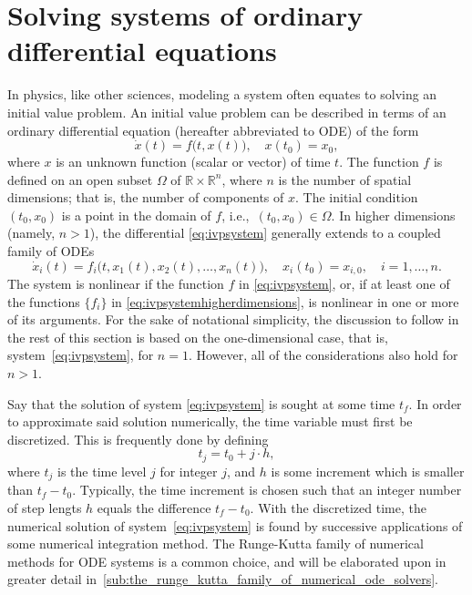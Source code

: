 \section[Solving systems of ordinary differential equations]%
{Solving systems of ordinary differential eq\null{}uations}%
\label{sec:solving_systems_of_ordinary_differential_equations}

In physics, like other sciences, modeling a system often equates to solving an
initial value problem. An initial value problem can be described in terms of an
ordinary differential equation (hereafter abbreviated to ODE) of the form
\begin{equation}
    \label{eq:ivpsystem}
    \dot{x}(t) = f\big(t,x(t)\big), \quad x(t_{0}) = x_{0},
\end{equation}
where $x$ is an unknown function (scalar or vector) of time $t$. The function
$f$ is defined on an open subset $\Omega$ of $\mathbb{R}\times\mathbb{R}^{n}$,
where $n$ is the number of spatial dimensions; that is, the number of
components of $x$. The initial condition $(t_{0},x_{0})$ is a point in the
domain of $f$, i.e.,\ $(t_{0},x_{0})\in\Omega$. In higher dimensions (namely,
$n>1$), the differential \cref{eq:ivpsystem} generally extends to a coupled
family of ODEs
\begin{equation}
    \label{eq:ivpsystemhigherdimensions}
    \dot{x}_{i}(t) = f_{i}\big(t,x_{1}(t),x_{2}(t),\ldots,x_{n}(t)\big),%
    \quad x_{i}(t_{0}) = x_{i,0}, \quad i = 1,\ldots,n.
\end{equation}
The system is nonlinear if the function $f$ in \cref{eq:ivpsystem}, or, if at
least one of the functions $\{f_{i}\}$ in \cref{eq:ivpsystemhigherdimensions},
is nonlinear in one or more of its arguments. For the sake of notational
simplicity, the discussion to follow in the rest of this section is based
on the one-dimensional case, that is, system~\eqref{eq:ivpsystem}, for $n=1$.
However, all of the considerations also hold for $n>1$.

Say that the solution of system \eqref{eq:ivpsystem} is sought at some time
$t_{f}$. In order to approximate said solution numerically, the time variable
must first be discretized. This is frequently done by defining
\begin{equation}
    \label{eq:discretime}
    t_{j} = t_{0}+j\cdot{}h,
\end{equation}
where $t_{j}$ is the time level $j$ for integer $j$, and $h$ is some increment
which is smaller than $t_{f}-t_{0}$. Typically, the time increment is chosen
such that an integer number of step lengts $h$ equals the difference
$t_{f}-t_{0}$. With the discretized time, the numerical solution of
system~\eqref{eq:ivpsystem} is found by successive applications of some
numerical integration method. The Runge-Kutta family of numerical methods for
ODE systems is a common choice, and will be elaborated upon in greater detail
in~\cref{sub:the_runge_kutta_family_of_numerical_ode_solvers}.

